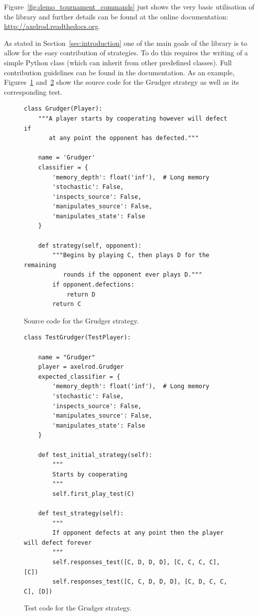 \documentclass{article}
\begin{document}
Figure~\ref{fig:demo_tournament_commands} just shows the very basic utilisation
of the library and further details can be found at the online documentation:
\url{http://axelrod.readthedocs.org}.

As stated in Section~\ref{sec:introduction} one of the main goals of the library
is to allow for the easy contribution of strategies. To do this requires the
writing of a simple Python class (which can inherit from other predefined
classes). Full contribution guidelines can be found in the documentation.
As an example, Figures~\ref{fig:grudger} and~\ref{fig:grudger_test} show the source code for
the Grudger strategy as well as its corresponding test.

\begin{figure}[!hbtp]
    \begin{verbatim}
class Grudger(Player):
    """A player starts by cooperating however will defect if
       at any point the opponent has defected."""

    name = 'Grudger'
    classifier = {
        'memory_depth': float('inf'),  # Long memory
        'stochastic': False,
        'inspects_source': False,
        'manipulates_source': False,
        'manipulates_state': False
    }

    def strategy(self, opponent):
        """Begins by playing C, then plays D for the remaining
           rounds if the opponent ever plays D."""
        if opponent.defections:
            return D
        return C
    \end{verbatim}
    \caption{Source code for the Grudger strategy.}
    \label{fig:grudger}
\end{figure}



\begin{figure}[!hbtp]
    \begin{verbatim}
class TestGrudger(TestPlayer):

    name = "Grudger"
    player = axelrod.Grudger
    expected_classifier = {
        'memory_depth': float('inf'),  # Long memory
        'stochastic': False,
        'inspects_source': False,
        'manipulates_source': False,
        'manipulates_state': False
    }

    def test_initial_strategy(self):
        """
        Starts by cooperating
        """
        self.first_play_test(C)

    def test_strategy(self):
        """
        If opponent defects at any point then the player will defect forever
        """
        self.responses_test([C, D, D, D], [C, C, C, C], [C])
        self.responses_test([C, C, D, D, D], [C, D, C, C, C], [D])
    \end{verbatim}
    \caption{Test code for the Grudger strategy.}
    \label{fig:grudger_test}
\end{figure}
\end{document}
